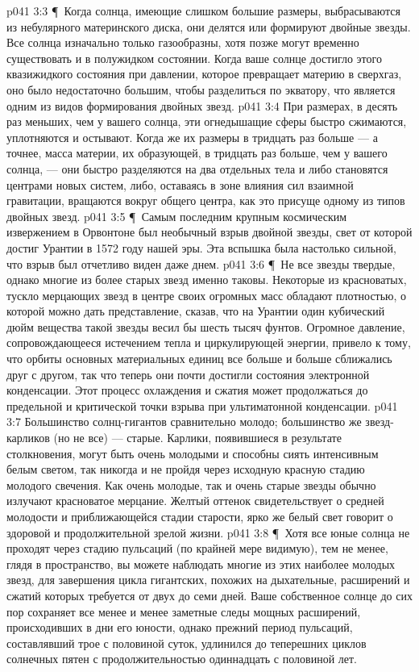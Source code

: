 \vs p041 3:3 \P\ Когда солнца, имеющие слишком большие размеры, выбрасываются из небулярного материнского диска, они делятся или формируют двойные звезды. Все солнца изначально только газообразны, хотя позже могут временно существовать и в полужидком состоянии. Когда ваше солнце достигло этого квазижидкого состояния при давлении, которое превращает материю в сверхгаз, оно было недостаточно большим, чтобы разделиться по экватору, что является одним из видов формирования двойных звезд.
\vs p041 3:4 При размерах, в десять раз меньших, чем у вашего солнца, эти огнедышащие сферы быстро сжимаются, уплотняются и остывают. Когда же их размеры в тридцать раз больше --- а точнее, масса материи, их образующей, в тридцать раз больше, чем у вашего солнца, --- они быстро разделяются на два отдельных тела и либо становятся центрами новых систем, либо, оставаясь в зоне влияния сил взаимной гравитации, вращаются вокруг общего центра, как это присуще одному из типов двойных звезд.
\vs p041 3:5 \P\ Самым последним крупным космическим извержением в Орвонтоне был необычный взрыв двойной звезды, свет от которой достиг Урантии в 1572 году нашей эры. Эта вспышка была настолько сильной, что взрыв был отчетливо виден даже днем.
\vs p041 3:6 \P\ Не все звезды твердые, однако многие из более старых звезд именно таковы. Некоторые из красноватых, тускло мерцающих звезд в центре своих огромных масс обладают плотностью, о которой можно дать представление, сказав, что на Урантии один кубический дюйм вещества такой звезды весил бы шесть тысяч фунтов. Огромное давление, сопровождающееся истечением тепла и циркулирующей энергии, привело к тому, что орбиты основных материальных единиц все больше и больше сближались друг с другом, так что теперь они почти достигли состояния электронной конденсации. Этот процесс охлаждения и сжатия может продолжаться до предельной и критической точки взрыва при ультиматонной конденсации.
\vs p041 3:7 Большинство солнц\hyp{}гигантов сравнительно молодо; большинство же звезд\hyp{}карликов (но не все) --- старые. Карлики, появившиеся в результате столкновения, могут быть очень молодыми и способны сиять интенсивным белым светом, так никогда и не пройдя через исходную красную стадию молодого свечения. Как очень молодые, так и очень старые звезды обычно излучают красноватое мерцание. Желтый оттенок свидетельствует о средней молодости и приближающейся стадии старости, ярко же белый свет говорит о здоровой и продолжительной зрелой жизни.
\vs p041 3:8 \P\ Хотя все юные солнца не проходят через стадию пульсаций (по крайней мере видимую), тем не менее, глядя в пространство, вы можете наблюдать многие из этих наиболее молодых звезд, для завершения цикла гигантских, похожих на дыхательные, расширений и сжатий которых требуется от двух до семи дней. Ваше собственное солнце до сих пор сохраняет все менее и менее заметные следы мощных расширений, происходивших в дни его юности, однако прежний период пульсаций, составлявший трое с половиной суток, удлинился до теперешних циклов солнечных пятен с продолжительностью одиннадцать с половиной лет.
